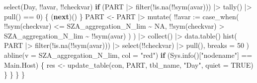 \documentclass[
  10pt,
  a4paper,oneside]{article}
\newenvironment{Shaded}{\begin{snugshade}}{\end{snugshade}}
\newcommand{\AttributeTok}[1]{\textcolor[rgb]{0.77,0.63,0.00}{#1}}
\newcommand{\ConstantTok}[1]{\textcolor[rgb]{0.00,0.00,0.00}{#1}}
\newcommand{\ControlFlowTok}[1]{\textcolor[rgb]{0.13,0.29,0.53}{\textbf{#1}}}
\newcommand{\DecValTok}[1]{\textcolor[rgb]{0.00,0.00,0.81}{#1}}
\newcommand{\FunctionTok}[1]{\textcolor[rgb]{0.00,0.00,0.00}{#1}}
\newcommand{\NormalTok}[1]{#1}
\newcommand{\OtherTok}[1]{\textcolor[rgb]{0.56,0.35,0.01}{#1}}
\newcommand{\SpecialCharTok}[1]{\textcolor[rgb]{0.00,0.00,0.00}{#1}}
\newcommand{\StringTok}[1]{\textcolor[rgb]{0.31,0.60,0.02}{#1}}
\begin{document}
\begin{Shaded}
\begin{Highlighting}[]
                \FunctionTok{select}\NormalTok{(Day, }\SpecialCharTok{!!}\NormalTok{avar, }\SpecialCharTok{!!}\NormalTok{checkvar)}
            \ControlFlowTok{if}\NormalTok{ (PART }\SpecialCharTok{|\textgreater{}}
                \FunctionTok{filter}\NormalTok{(}\SpecialCharTok{!}\FunctionTok{is.na}\NormalTok{(}\SpecialCharTok{!!}\FunctionTok{sym}\NormalTok{(avar))) }\SpecialCharTok{|\textgreater{}}
                \FunctionTok{tally}\NormalTok{() }\SpecialCharTok{|\textgreater{}}
                \FunctionTok{pull}\NormalTok{() }\SpecialCharTok{==} \DecValTok{0}\NormalTok{) \{}
\NormalTok{                (}\ControlFlowTok{next}\NormalTok{)()}
\NormalTok{            \}}
\NormalTok{            PART }\OtherTok{\textless{}{-}}\NormalTok{ PART }\SpecialCharTok{|\textgreater{}}
                \FunctionTok{mutate}\NormalTok{(}
                  \SpecialCharTok{!!}\AttributeTok{avar :=} \FunctionTok{case\_when}\NormalTok{(}
                    \SpecialCharTok{!!}\FunctionTok{sym}\NormalTok{(checkvar) }\SpecialCharTok{\textless{}=}
\NormalTok{                      SZA\_aggregation\_N\_lim }\SpecialCharTok{\textasciitilde{}} \ConstantTok{NA}\NormalTok{, }\SpecialCharTok{!!}\FunctionTok{sym}\NormalTok{(checkvar) }\SpecialCharTok{\textgreater{}}
\NormalTok{                      SZA\_aggregation\_N\_lim }\SpecialCharTok{\textasciitilde{}} \SpecialCharTok{!!}\FunctionTok{sym}\NormalTok{(avar)}
\NormalTok{                )}
\NormalTok{              ) }\SpecialCharTok{|\textgreater{}}
                \FunctionTok{collect}\NormalTok{() }\SpecialCharTok{|\textgreater{}}
                \FunctionTok{data.table}\NormalTok{()}
            \FunctionTok{hist}\NormalTok{(}
\NormalTok{                PART }\SpecialCharTok{|\textgreater{}}
                  \FunctionTok{filter}\NormalTok{(}\SpecialCharTok{!}\FunctionTok{is.na}\NormalTok{(}\SpecialCharTok{!!}\FunctionTok{sym}\NormalTok{(avar))) }\SpecialCharTok{|\textgreater{}}
                  \FunctionTok{select}\NormalTok{(}\SpecialCharTok{!!}\NormalTok{checkvar) }\SpecialCharTok{|\textgreater{}}
                  \FunctionTok{pull}\NormalTok{(), }\AttributeTok{breaks =} \DecValTok{50}
\NormalTok{            )}
            \FunctionTok{abline}\NormalTok{(}\AttributeTok{v =}\NormalTok{ SZA\_aggregation\_N\_lim, }\AttributeTok{col =} \StringTok{"red"}\NormalTok{)}
            \ControlFlowTok{if}\NormalTok{ (}\FunctionTok{Sys.info}\NormalTok{()[}\StringTok{"nodename"}\NormalTok{] }\SpecialCharTok{==}\NormalTok{ Main.Host) \{}
\NormalTok{                res }\OtherTok{\textless{}{-}} \FunctionTok{update\_table}\NormalTok{(con, PART, tbl\_name, }\StringTok{"Day"}\NormalTok{, }\AttributeTok{quiet =} \ConstantTok{TRUE}\NormalTok{)}
\NormalTok{            \}}
\NormalTok{        \}}
\NormalTok{    \}}
\NormalTok{\}}
\end{Highlighting}
\end{Shaded}
\end{document}
